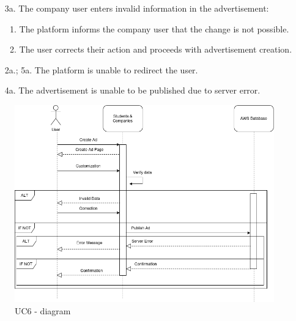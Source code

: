 \begin{itemize}[label={[\textbf{UC}]}, align=left, leftmargin=*]
\begin{enumerate}[label=\arabic*.]
        \item[3a.] The company user enters invalid information in the advertisement:
            \begin{enumerate}[label=\arabic*.]
                \item The platform informs the company user that the change is not possible.
                \item The user corrects their action and proceeds with advertisement creation.
            \end{enumerate}
        \item[2a.; 5a.] The platform is unable to redirect the user.
        \item[4a.] The advertisement is unable to be published due to server error.
        \end{enumerate}

     \begin{figure}[H]
    	\includegraphics[width=\textwidth,height=\textheight,keepaspectratio]{RASD-Latex/assets/Use Case Diagrams/UC6.png}
    	\caption{UC6 - diagram}
    	\label{fig:DataRequest}
    \end{figure}


\end{itemize}
